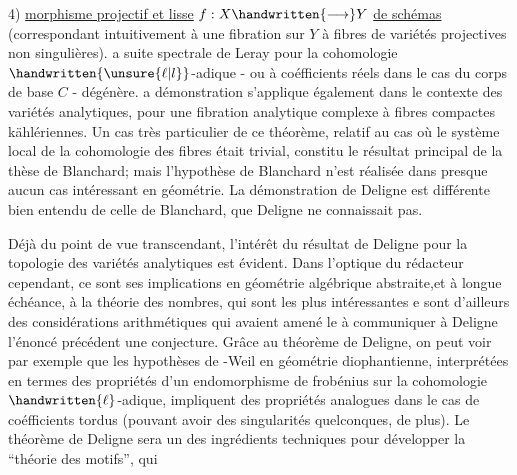 4) \uline{ morphisme projectif et lisse} $f:X\handwritten{\longrightarrow}Y$ \uline{de schémas} (correspondant intuitivement à une fibration sur $Y$ à fibres de variétés projectives non singulières).   a suite spectrale de Leray pour la cohomologie $\handwritten{\unsure{\ell|l}}$-adique - ou à coéfficients réels dans le cas du corps de base $C$\deleted{)} - dégénère\deleted{)}.  a démonstration s'applique également dans le contexte des variétés analytiques, pour une fibration analytique complexe à fibres compactes kählériennes. Un cas très particulier de ce théorème, relatif au cas où le système local de la cohomologie des fibres était trivial, constitu le résultat principal de la thèse de Blanchard; mais l'hypothèse de Blanchard n'est réalisée dans presque aucun cas intéressant en géométrie. La démonstration de Deligne est différente bien entendu de celle de Blanchard, que Deligne ne connaissait pas.

Déjà du point de vue transcendant, l'intérêt du résultat de Deligne  pour la topologie des variétés analytiques est évident. Dans l'optique du rédacteur cependant, ce sont ses implications en géométrie algébrique abstraite,et à longue échéance, à la théorie des nombres, qui sont les plus intéressantes\handwritten{,}  e sont d'ailleurs des considérations arithmétiques qui avaient amené le  à communiquer à Deligne  l'énoncé précédent  une conjecture. Grâce au théorème de Deligne, on peut voir par exemple que les hypothèses de -Weil en géométrie diophantienne, interprétées en termes des propriétés d'un endomorphisme de frobénius sur la cohomologie $\handwritten{\ell}$-adique,  impliquent des propriétés analogues dans le cas de coéfficients tordus (pouvant avoir des singularités quelconques, de plus). Le théorème de Deligne sera un des  ingrédients techniques  pour développer la ``théorie des motifs'', qui 

